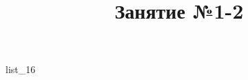 \documentclass[12pt, a4paper]{article}
\begin{document}
	\title{Занятие №1-2}
	{list_16}
\end{document}
